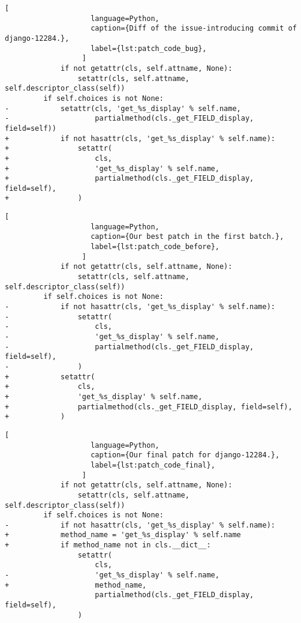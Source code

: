 \begin{lstlisting}[
                    language=Python, 
                    caption={Diff of the issue-introducing commit of django-12284.}, 
                    label={lst:patch_code_bug},
                  ]
             if not getattr(cls, self.attname, None):
                 setattr(cls, self.attname, self.descriptor_class(self))
         if self.choices is not None:
-            setattr(cls, 'get_%s_display' % self.name,
-                    partialmethod(cls._get_FIELD_display, field=self))
+            if not hasattr(cls, 'get_%s_display' % self.name):
+                setattr(
+                    cls,
+                    'get_%s_display' % self.name,
+                    partialmethod(cls._get_FIELD_display, field=self),
+                )
\end{lstlisting}

\begin{lstlisting}[
                    language=Python, 
                    caption={Our best patch in the first batch.}, 
                    label={lst:patch_code_before},
                  ]
             if not getattr(cls, self.attname, None):
                 setattr(cls, self.attname, self.descriptor_class(self))
         if self.choices is not None:
-            if not hasattr(cls, 'get_%s_display' % self.name):
-                setattr(
-                    cls,
-                    'get_%s_display' % self.name,
-                    partialmethod(cls._get_FIELD_display, field=self),
-                )
+            setattr(
+                cls,
+                'get_%s_display' % self.name,
+                partialmethod(cls._get_FIELD_display, field=self),
+            )

\end{lstlisting}

\begin{lstlisting}[
                    language=Python, 
                    caption={Our final patch for django-12284.}, 
                    label={lst:patch_code_final},
                  ]
             if not getattr(cls, self.attname, None):
                 setattr(cls, self.attname, self.descriptor_class(self))
         if self.choices is not None:
-            if not hasattr(cls, 'get_%s_display' % self.name):
+            method_name = 'get_%s_display' % self.name
+            if method_name not in cls.__dict__:
                 setattr(
                     cls,
-                    'get_%s_display' % self.name,
+                    method_name,
                     partialmethod(cls._get_FIELD_display, field=self),
                 )

\end{lstlisting}

